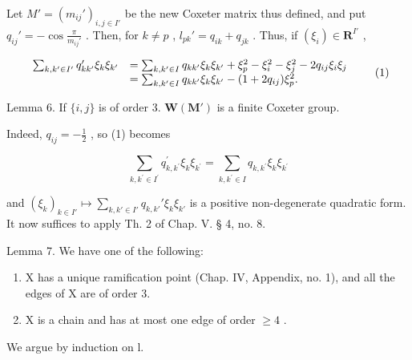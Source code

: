 Let \(M' = (m_{ij}')_{i,j \in I'}\) be the new Coxeter matrix thus defined, and put \(q_{ij}' = -\cos \frac{\pi}{m_{ij}'}\) . Then, for \(k \neq p\) , \(l_{pk}' = q_{ik} + q_{jk}\) . Thus, if \((\xi_i) \in \mathbf{R}^{I'}\) ,

\[
\begin{array}{r l} \sum_ {k, k ^ {\prime} \in I ^ {\prime}} q _ {k k ^ {\prime}} ^ {\prime} \xi_ {k} \xi_ {k ^ {\prime}} & = \sum_ {k, k ^ {\prime} \in I} q _ {k k ^ {\prime}} \xi _ {k} \xi_ {k ^ {\prime}} + \xi_ {p} ^ {2} - \xi_ {i} ^ {2} - \xi_ {j} ^ {2} - 2 q _ {i j} \xi_ {i} \xi_ {j} \\ & = \sum_ {k, k ^ {\prime} \in I} q _ {k k ^ {\prime}} \xi _ {k} \xi_ {k ^ {\prime}} - (1 + 2 q _ {i j}) \xi_ {p} ^ {2}. \end{array} \tag {1}
\]

Lemma 6. If \(\{i,j\}\) is of order 3. \(\mathbf{W}(\mathbf{M}')\) is a finite Coxeter group.

Indeed, \(q_{ij} = -\frac{1}{2}\) , so (1) becomes

\[
\sum_ {k, k ^ {\prime} \in I ^ {\prime}} q _ {k, k ^ {\prime}} ^ {\prime} \xi_ {k} \xi_ {k ^ {\prime}} = \sum_ {k, k ^ {\prime} \in I} q _ {k, k ^ {\prime}} \xi_ {k} \xi_ {k ^ {\prime}}
\]

and \((\xi_k)_{k\in I'}\mapsto \sum_{k,k'\in I'}q_{k,k'}'\xi_k\xi_{k'}\) is a positive non-degenerate quadratic form. It now suffices to apply Th. 2 of Chap. V. § 4, no. 8.

Lemma 7. We have one of the following:

\begin{enumerate}
\def\labelenumi{\alph{enumi})}
\item
  X has a unique ramification point (Chap. IV, Appendix, no. 1), and all the edges of X are of order 3.
\item
  X is a chain and has at most one edge of order \(\geqslant 4\) .
\end{enumerate}

We argue by induction on l.

